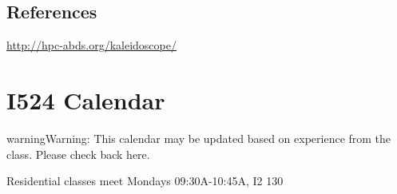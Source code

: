 \subsection{References}
\label{\detokenize{i524/index:references}}
\url{http://hpc-abds.org/kaleidoscope/}


\section{I524 Calendar}
\label{\detokenize{i524/calendar:index-0}}\label{\detokenize{i524/calendar::doc}}\label{\detokenize{i524/calendar:i524-calendar}}
\begin{sphinxadmonition}{warning}{Warning:}
This calendar may be updated based on experience from the class.
Please check back here.
\end{sphinxadmonition}

Residential classes meet Mondays 09:30A-10:45A, I2 130

